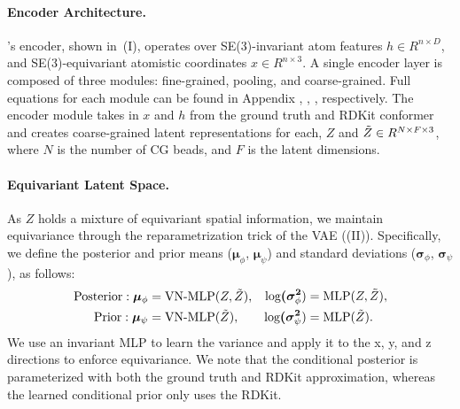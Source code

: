 \paragraph{Encoder Architecture.}
\modelns's encoder, shown in~(I), operates over SE(3)-invariant atom features $h \in R^{n\times D}$, and SE(3)-equivariant atomistic coordinates $x \in R^{n\times3}$. A single encoder layer is composed of three modules: fine-grained, pooling, and coarse-grained. Full equations for each module can be found in Appendix , , , respectively. 
The encoder module takes in $x$ and $h$ from the ground truth and RDKit conformer and creates coarse-grained latent representations for each, $Z$ and $\Tilde{Z} \in R^{N\times F \times3}$, where $N$ is the number of CG beads, and $F$ is the latent dimensions.

\paragraph{Equivariant Latent Space.} As $Z$ holds a mixture of equivariant spatial information, we maintain equivariance through the reparametrization trick of the VAE ((II)). Specifically, we define the posterior and prior means ($\bm{\mu}_\phi$, $\bm{\mu}_\psi$) and standard deviations ($\bm{\sigma}_\phi$, $\bm{\sigma}_\psi$), as follows:
\begin{equation} 
\begin{aligned}
\text{Posterior}: \bm{\mu}_\phi &= \text{VN-MLP}(Z, \Tilde{Z}), \\
\text{Prior}: \bm{\mu}_\psi &= \text{VN-MLP}(\Tilde{Z}), \\
\end{aligned}
\quad
\begin{aligned}
\bm{\text{log}(\sigma^2}_\phi) &= \text{MLP}(Z, \Tilde{Z}), \\
\bm{\text{log}(\sigma^2}_\psi) &= \text{MLP}(\Tilde{Z}).
\end{aligned}
\end{equation}
We use an invariant MLP to learn the variance and apply it to the x, y, and z directions to enforce equivariance.
We note that the conditional posterior is parameterized with both the ground truth and RDKit approximation, whereas the learned conditional prior only uses the RDKit.%
